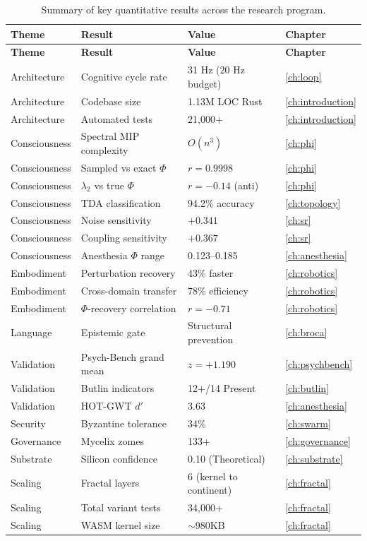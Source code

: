 \documentclass[12pt]{book}
\begin{document}
\begin{longtable}{p{3.5cm}p{4cm}p{3.5cm}l}
\caption{Summary of key quantitative results across the research program.}
\label{tab:key-results} \\
\toprule
\textbf{Theme} & \textbf{Result} & \textbf{Value} & \textbf{Chapter} \\
\midrule
\endfirsthead
\toprule
\textbf{Theme} & \textbf{Result} & \textbf{Value} & \textbf{Chapter} \\
\midrule
\endhead
Architecture & Cognitive cycle rate & 31 Hz (20 Hz budget) & \ref{ch:loop} \\
Architecture & Codebase size & 1.13M LOC Rust & \ref{ch:introduction} \\
Architecture & Automated tests & 21,000+ & \ref{ch:introduction} \\
Consciousness & Spectral MIP complexity & $O(n^3)$ & \ref{ch:phi} \\
Consciousness & Sampled vs exact $\Phi$ & $r = 0.9998$ & \ref{ch:phi} \\
Consciousness & $\lambda_2$ vs true $\Phi$ & $r = -0.14$ (anti) & \ref{ch:phi} \\
Consciousness & TDA classification & 94.2\% accuracy & \ref{ch:topology} \\
Consciousness & Noise sensitivity & $+0.341$ & \ref{ch:sr} \\
Consciousness & Coupling sensitivity & $+0.367$ & \ref{ch:sr} \\
Consciousness & Anesthesia $\Phi$ range & 0.123--0.185 & \ref{ch:anesthesia} \\
Embodiment & Perturbation recovery & 43\% faster & \ref{ch:robotics} \\
Embodiment & Cross-domain transfer & 78\% efficiency & \ref{ch:robotics} \\
Embodiment & $\Phi$-recovery correlation & $r = -0.71$ & \ref{ch:robotics} \\
Language & Epistemic gate & Structural prevention & \ref{ch:broca} \\
Validation & Psych-Bench grand mean & $z = +1.190$ & \ref{ch:psychbench} \\
Validation & Butlin indicators & 12+/14 Present & \ref{ch:butlin} \\
Validation & HOT-GWT $d'$ & 3.63 & \ref{ch:anesthesia} \\
Security & Byzantine tolerance & 34\% & \ref{ch:swarm} \\
Governance & Mycelix zomes & 133+ & \ref{ch:governance} \\
Substrate & Silicon confidence & 0.10 (Theoretical) & \ref{ch:substrate} \\
Scaling & Fractal layers & 6 (kernel to continent) & \ref{ch:fractal} \\
Scaling & Total variant tests & 34,000+ & \ref{ch:fractal} \\
Scaling & WASM kernel size & ${\sim}$980KB & \ref{ch:fractal} \\
\bottomrule
\end{longtable}
\end{document}
